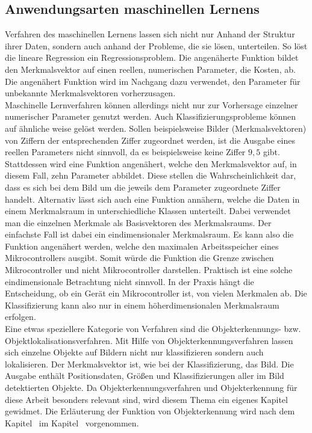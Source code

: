 \subsection{Anwendungsarten maschinellen Lernens}\label{subsec:Unterschiedliche Machine Learning Verfahren}
    Verfahren des maschinellen Lernens lassen sich nicht nur Anhand der Struktur ihrer Daten, sondern auch anhand der Probleme, die sie lösen, unterteilen. So löst die lineare Regression ein Regressionsproblem. Die angenäherte Funktion bildet den Merkmalsvektor auf einen reellen, numerischen Parameter, die Kosten, ab. Die angenähert Funktion wird im Nachgang dazu verwendet, den Parameter für unbekannte Merkmalsvektoren vorherzusagen\cite{Goodfellow-et-al-2016-5}.\\ Maschinelle Lernverfahren können allerdings nicht nur zur Vorhersage einzelner numerischer Parameter genutzt werden. Auch Klassifizierungsprobleme können auf ähnliche weise gelöst werden. Sollen beispielsweise Bilder (Merkmalsvektoren) von Ziffern der entsprechenden Ziffer zugeordnet werden, ist die Ausgabe eines reellen Parameters nicht sinnvoll, da es beispielsweise keine Ziffer $9,5$ gibt. Stattdessen wird eine Funktion angenähert, welche den Merkmalsvektor auf, in diesem Fall, zehn Parameter abbildet. Diese stellen die Wahrscheinlichkeit dar, dass es sich bei dem Bild um die jeweils dem Parameter zugeordnete Ziffer handelt\cite{Goodfellow-et-al-2016-5}. Alternativ lässt sich auch eine Funktion annähern, welche die Daten in einem Merkmalsraum in unterschiedliche Klassen unterteilt. Dabei verwendet man die einzelnen Merkmale als Basisvektoren des Merkmalsraums\cite{Ertel2016}. Der einfachste Fall ist dabei ein eindimensionaler Merkmalsraum. Es kann also die Funktion angenähert werden, welche den maximalen Arbeitsspeicher eines Mikrocontrollers ausgibt. Somit würde die Funktion die Grenze zwischen Mikrocontroller und nicht Mikrocontroller darstellen. Praktisch ist eine solche eindimensionale Betrachtung nicht sinnvoll. In der Praxis hängt die Entscheidung, ob ein Gerät ein Mikrocontroller ist, von vielen Merkmalen ab. Die Klassifizierung kann also nur in einem höherdimensionalen Merkmalsraum erfolgen.\\ Eine etwas speziellere Kategorie von Verfahren sind die Objekterkennungs- bzw. Objektlokalisationsverfahren. Mit Hilfe von Objekterkennungsverfahren lassen sich einzelne Objekte auf Bildern nicht nur klassifizieren sondern auch lokalisieren. Der Merkmalsvektor ist, wie bei der Klassifizierung, das Bild. Die Ausgabe enthält Positionsdaten, Größen und Klassifizierungen aller im Bild detektierten Objekte\cite{Süße2014}. Da Objekterkennungsverfahren und Objekterkennung für diese Arbeit besonders relevant sind, wird diesem Thema ein eigenes Kapitel gewidmet. Die Erläuterung der Funktion von Objekterkennung wird nach dem Kapitel~ im Kapitel~ vorgenommen.

